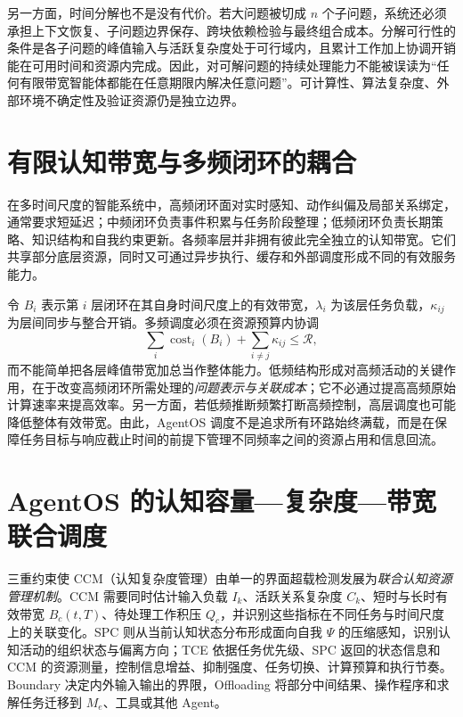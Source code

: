 另一方面，时间分解也不是没有代价。若大问题被切成 $n$ 个子问题，系统还必须承担上下文恢复、子问题边界保存、跨块依赖检验与最终组合成本。分解可行性的条件是各子问题的峰值输入与活跃复杂度处于可行域内，且累计工作加上协调开销能在可用时间和资源内完成。因此，对可解问题的持续处理能力不能被误读为“任何有限带宽智能体都能在任意期限内解决任意问题”。可计算性、算法复杂度、外部环境不确定性及验证资源仍是独立边界。

\section{有限认知带宽与多频闭环的耦合}
\label{sec:multifrequency_bandwidth}

在多时间尺度的智能系统中，高频闭环面对实时感知、动作纠偏及局部关系绑定，通常要求短延迟；中频闭环负责事件积累与任务阶段整理；低频闭环负责长期策略、知识结构和自我约束更新。各频率层并非拥有彼此完全独立的认知带宽。它们共享部分底层资源，同时又可通过异步执行、缓存和外部调度形成不同的有效服务能力。

令 $B_i$ 表示第 $i$ 层闭环在其自身时间尺度上的有效带宽，$\lambda_i$ 为该层任务负载，$\kappa_{ij}$ 为层间同步与整合开销。多频调度必须在资源预算内协调
\begin{equation}
 \sum_i \operatorname{cost}_i(B_i)+\sum_{i\ne j}\kappa_{ij}\leq\mathcal R,
 \label{eq:multifrequency_budget}
\end{equation}
而不能简单把各层峰值带宽加总当作整体能力。低频结构形成对高频活动的关键作用，在于改变高频闭环所需处理的\emph{问题表示与关联成本}；它不必通过提高高频原始计算速率来提高效率。另一方面，若低频推断频繁打断高频控制，高层调度也可能降低整体有效带宽。由此，AgentOS 调度不是追求所有环路始终满载，而是在保障任务目标与响应截止时间的前提下管理不同频率之间的资源占用和信息回流。

\section{AgentOS 的认知容量—复杂度—带宽联合调度}
\label{sec:joint_scheduler}

三重约束使 CCM（认知复杂度管理）由单一的界面超载检测发展为\emph{联合认知资源管理机制}。CCM 需要同时估计输入负载 $I_k$、活跃关系复杂度 $C_k$、短时与长时有效带宽 $B_c(t,T)$、待处理工作积压 $Q_c$，并识别这些指标在不同任务与时间尺度上的关联变化。SPC 则从当前认知状态分布形成面向自我 $\Psi$ 的压缩感知，识别认知活动的组织状态与偏离方向；TCE 依据任务优先级、SPC 返回的状态信息和 CCM 的资源测量，控制信息增益、抑制强度、任务切换、计算预算和执行节奏。Boundary 决定内外输入输出的界限，Offloading 将部分中间结果、操作程序和求解任务迁移到 $M_e$、工具或其他 Agent。

